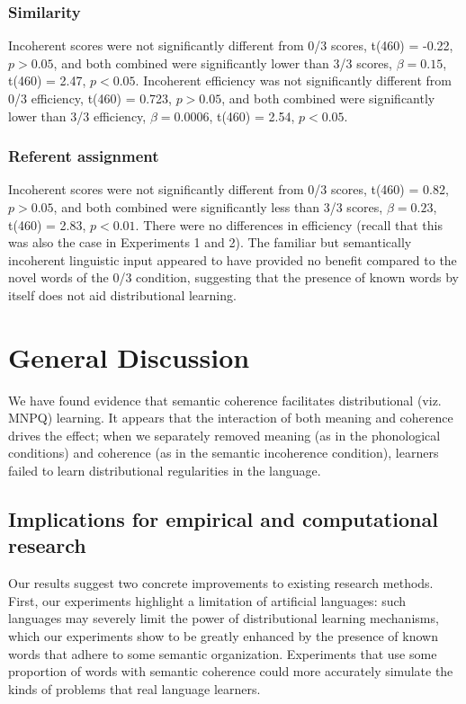 \documentclass[man,floatsintext]{apa6}
\begin{document}
\subsubsection{Similarity}
Incoherent scores were not significantly different from 0/3 scores, t(460) = -0.22, $p > 0.05$, and both combined were significantly lower than 3/3 scores, $\beta = 0.15$, t(460) = 2.47, $p < 0.05$. Incoherent efficiency was not significantly different from 0/3 efficiency, t(460) = 0.723, $p > 0.05$, and both combined were significantly lower than 3/3 efficiency, $\beta = 0.0006$, t(460) = 2.54, $p < 0.05$.

\subsubsection{Referent assignment}
Incoherent scores were not significantly different from 0/3 scores, t(460) = 0.82, $p > 0.05$, and both combined were significantly less than 3/3 scores, $\beta = 0.23$, t(460) = 2.83, $p < 0.01$. There were no differences in efficiency (recall that this was also the case in Experiments 1 and 2). The familiar but semantically incoherent linguistic input appeared to have provided no benefit compared to the novel words of the 0/3 condition, suggesting that the presence of known words by itself does not aid distributional learning.

\section{General Discussion}

We have found evidence that semantic coherence facilitates distributional (viz. MNPQ) learning. It appears that the interaction of both meaning and coherence drives the effect; when we separately removed meaning (as in the phonological conditions) and coherence (as in the semantic incoherence condition), learners failed to learn distributional regularities in the language.

\subsection{Implications for empirical and computational research}

Our results suggest two concrete improvements to existing research methods. First, our experiments highlight a limitation of artificial languages: such languages may severely limit the power of distributional learning mechanisms, which our experiments show to be greatly enhanced by the presence of known words that adhere to some semantic organization. Experiments that use some proportion of words with semantic coherence could more accurately simulate the kinds of problems that real language learners.
\end{document}
